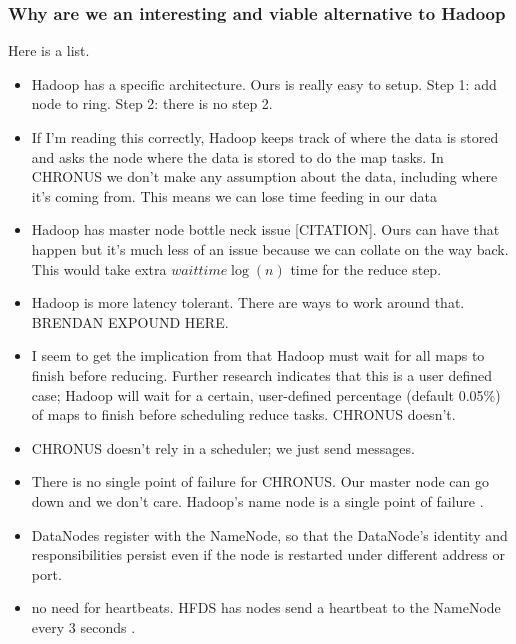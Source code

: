 \documentclass[conference, compsocconf, letterpaper]{IEEEtran}
\begin{document}
\subsubsection{Why are we an interesting and viable alternative to Hadoop}

Here is a list.

\begin{itemize}
    \item Hadoop has a specific architecture.  Ours is really easy to setup.  Step 1: add node to ring. Step 2: there is no step 2.

    \item If I'm reading this correctly, Hadoop keeps track of where the data is stored and asks the node where the data is stored to do the map tasks.  In CHRONUS we don't make any assumption about the data, including where it's coming from.  This means we can lose time feeding in our data


    \item Hadoop has master node bottle neck issue [CITATION].  Ours can have that happen but it's much less of an issue because we can collate on the way back.   This would take extra  $waittime \log(n)$ time for the reduce step. 

    \item Hadoop is more latency tolerant.  There are ways to work around that.  BRENDAN EXPOUND HERE.

    \item I seem to get the implication from \cite{mrsurvey} that Hadoop must wait for all maps to finish before reducing.  Further research indicates that this is a user defined case; Hadoop will wait for a certain, user-defined percentage (default 0.05\%) of maps to finish before scheduling reduce tasks.  CHRONUS doesn't.
    
    \item CHRONUS doesn't rely in a scheduler; we just send messages.  

    \item There is no single point of failure for CHRONUS.  Our master node can go down and we don't care. Hadoop's name node is a single point of failure \cite{shvachko2010hadoop}.
    \item DataNodes register with the NameNode, so that the DataNode's identity and responsibilities persist even if the node is restarted under different address or port.
    
    \item no need for heartbeats.  HFDS has nodes send a heartbeat to the NameNode every 3 seconds \cite{shvachko2010hadoop}.  
\end{itemize}
\end{document}
